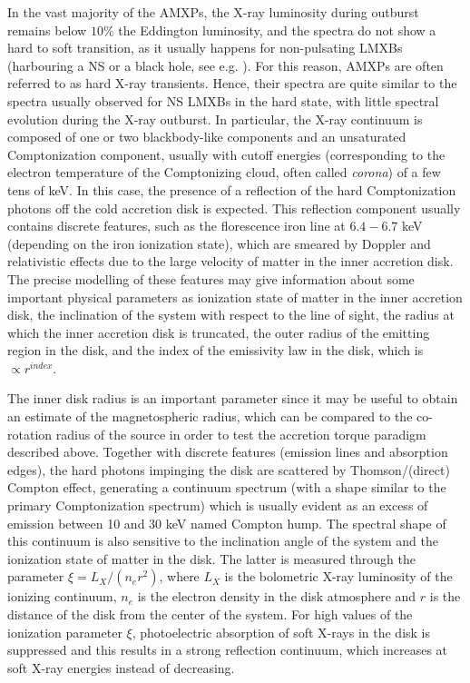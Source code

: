 \documentclass[graybox]{svmult}
\begin{document}
In the vast majority of the AMXPs, the X-ray luminosity during outburst remains below $10\%$ the Eddington luminosity, and the spectra do not show a hard to soft transition, as it usually happens for non-pulsating LMXBs (harbouring a NS or a black hole, see e.g. \cite{Done2007}). For this reason, AMXPs are often referred to as hard X-ray transients. Hence, their spectra are quite similar to the spectra usually observed for NS LMXBs in the hard state, with little spectral evolution during the X-ray outburst. In particular, the X-ray continuum is composed of one or two blackbody-like components and an unsaturated Comptonization component, usually with cutoff energies (corresponding to the electron temperature of the Comptonizing cloud, often called {\it corona}) of a few tens of keV. In this case, the presence of a reflection of the hard Comptonization photons off the cold accretion disk is expected. This reflection component usually contains discrete features, such as the florescence iron line at $6.4 - 6.7$ keV (depending on the iron ionization state), which are smeared by Doppler and relativistic effects due to the large velocity of matter in the inner accretion disk. The precise modelling of these features may give information about some important physical parameters as ionization state of matter in the inner accretion disk, the inclination of the system with respect to the line of sight, the radius at which the inner accretion disk is truncated, the outer radius of the emitting region in the disk, and the index of the emissivity law in the disk, which is $\propto r^{index}$. 

The inner disk radius is an important parameter since it may be useful to obtain an estimate of the magnetospheric radius, which can be compared to the co-rotation radius of the source in order to test the accretion torque paradigm described above. Together with discrete features (emission lines and absorption edges), the hard photons impinging the disk are scattered by Thomson/(direct) Compton effect, generating a continuum spectrum (with a shape similar to the primary Comptonization spectrum) which is usually evident as an excess of emission between 10 and 30 keV named Compton hump. The spectral shape of this continuum is also sensitive to the inclination angle of the system and the ionization state of matter in the disk. The latter is measured through the parameter $\xi = L_X/(n_e r^2)$, where $L_X$ is the bolometric X-ray luminosity of the ionizing continuum, $n_e$ is the electron density in the disk atmosphere and $r$ is the distance of the disk from the center of the system. For high values of the ionization parameter $\xi$, photoelectric absorption of soft X-rays in the disk is suppressed and this results in a strong reflection continuum, which increases at soft X-ray energies instead of decreasing.
\end{document}
